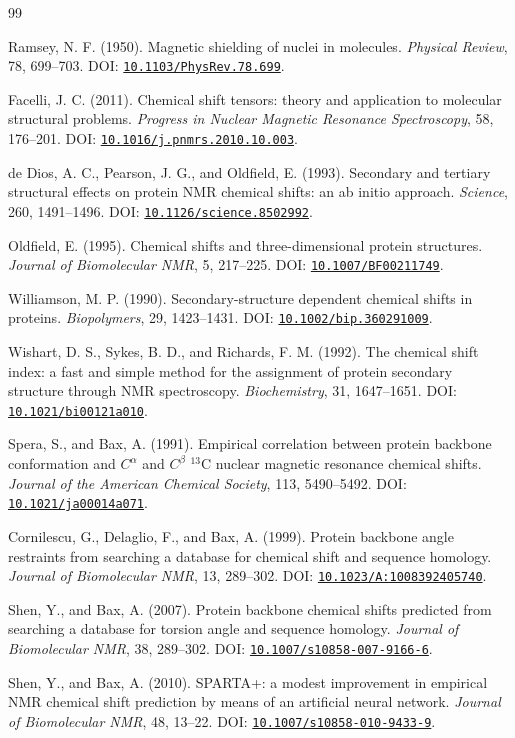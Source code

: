 \documentclass[11pt]{article}
\newcommand{\doi}[1]{\href{https://doi.org/#1}{\nolinkurl{#1}}}
\begin{document}
\begin{thebibliography}{99}

Ramsey, N. F. (1950).
Magnetic shielding of nuclei in molecules.
\emph{Physical Review}, 78, 699--703.
DOI: \doi{10.1103/PhysRev.78.699}.

Facelli, J. C. (2011).
Chemical shift tensors: theory and application to molecular structural
problems.
\emph{Progress in Nuclear Magnetic Resonance Spectroscopy}, 58, 176--201.
DOI: \doi{10.1016/j.pnmrs.2010.10.003}.

de Dios, A. C., Pearson, J. G., and Oldfield, E. (1993).
Secondary and tertiary structural effects on protein NMR chemical shifts:
an ab initio approach.
\emph{Science}, 260, 1491--1496.
DOI: \doi{10.1126/science.8502992}.

Oldfield, E. (1995).
Chemical shifts and three-dimensional protein structures.
\emph{Journal of Biomolecular NMR}, 5, 217--225.
DOI: \doi{10.1007/BF00211749}.

Williamson, M. P. (1990).
Secondary-structure dependent chemical shifts in proteins.
\emph{Biopolymers}, 29, 1423--1431.
DOI: \doi{10.1002/bip.360291009}.

Wishart, D. S., Sykes, B. D., and Richards, F. M. (1992).
The chemical shift index: a fast and simple method for the assignment of
protein secondary structure through NMR spectroscopy.
\emph{Biochemistry}, 31, 1647--1651.
DOI: \doi{10.1021/bi00121a010}.

Spera, S., and Bax, A. (1991).
Empirical correlation between protein backbone conformation and
\(C^\alpha\) and \(C^\beta\) \(^{13}\mathrm C\) nuclear magnetic resonance
chemical shifts.
\emph{Journal of the American Chemical Society}, 113, 5490--5492.
DOI: \doi{10.1021/ja00014a071}.

Cornilescu, G., Delaglio, F., and Bax, A. (1999).
Protein backbone angle restraints from searching a database for chemical
shift and sequence homology.
\emph{Journal of Biomolecular NMR}, 13, 289--302.
DOI: \doi{10.1023/A:1008392405740}.

Shen, Y., and Bax, A. (2007).
Protein backbone chemical shifts predicted from searching a database for
torsion angle and sequence homology.
\emph{Journal of Biomolecular NMR}, 38, 289--302.
DOI: \doi{10.1007/s10858-007-9166-6}.

Shen, Y., and Bax, A. (2010).
SPARTA+: a modest improvement in empirical NMR chemical shift prediction by
means of an artificial neural network.
\emph{Journal of Biomolecular NMR}, 48, 13--22.
DOI: \doi{10.1007/s10858-010-9433-9}.


\end{thebibliography}
\end{document}
